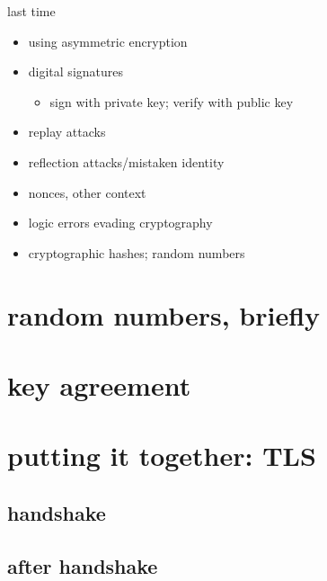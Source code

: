 \date{}
\title{}
\date{}
\usepackage{pgfplots}
\pgfplotsset{compat=1.16}

\begin{frame}
    \titlepage
\end{frame}

\begin{frame}{last time}
    \begin{itemize}
    \item using asymmetric encryption
    \item digital signatures
        \begin{itemize}
        \item sign with private key; verify with public key
        \end{itemize}
    \item replay attacks
    \item reflection attacks/mistaken identity
    \item nonces, other context
    \item logic errors evading cryptography
    \item cryptographic hashes; random numbers
    \end{itemize}
\end{frame}

\section{random numbers, briefly}


\section{key agreement}



\section{putting it together: TLS}

\subsection{handshake}


\subsection{after handshake}


